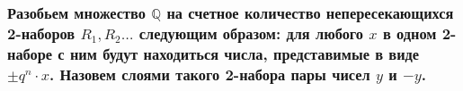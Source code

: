 \documentclass[12pt]{article}
\theoremstyle{definition}
\newcommand{\defineset}[2]{\left\{
	\left.
	#1
	\right\vert
	#2
	\right\}}
\begin{document}
	   
	    	   
	   \subsubsection{Разобьем множество $\mathbb{Q}$ на счетное количество непересекающихся 2-наборов $R_1, R_2 \dots$ следующим образом: для любого $x$ в одном 2-наборе с ним будут находиться числа, представимые в виде $\pm q^n \cdot x$.
	   Назовем слоями такого 2-набора пары чисел $y$ и $-y$.}
	   
\end{document}
